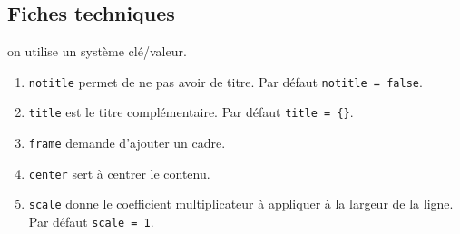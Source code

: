 \documentclass[12pt,a4paper]{article}
\begin{document}


\subsection{Fiches techniques}


\IDoption{} on utilise un système clé/valeur.
\begin{enumerate}
	\item \verb#notitle# permet de ne pas avoir de titre.
	      Par défaut \verb#notitle = false#.

	\item \verb#title# est le titre complémentaire.
	      Par défaut \verb#title = {}#.

	\item \verb#frame# demande d'ajouter un cadre.

	\item \verb#center# sert à centrer le contenu.

	\item \verb#scale# donne le coefficient multiplicateur à appliquer à la largeur de la ligne.
	      Par défaut \verb#scale = 1#.
\end{enumerate}
\end{document}
